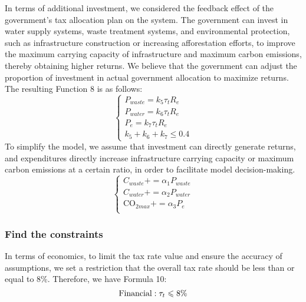 \documentclass[12pt]{article}  %
\begin{document}
In terms of additional investment, we considered the feedback effect of the government's tax allocation plan on the system. The government can invest in water supply systems, waste treatment systems, and environmental protection, such as infrastructure construction or increasing afforestation efforts, to improve the maximum carrying capacity of infrastructure and maximum carbon emissions, thereby obtaining higher returns. We believe that the government can adjust the proportion of investment in actual government allocation to maximize returns. The resulting Function 8 is as follows:
\begin{equation}
	\begin{cases}
		P_{waste} = k_5\tau_tR_e\\
		P_{water} = k_6\tau_tR_e\\
		P_{e}=k_7\tau_{t}R_e \\
		k_5+k_6+k_7 \leqslant 0.4
	\end{cases}
\end{equation}
To simplify the model, we assume that investment can directly generate returns, and expenditures directly increase infrastructure carrying capacity or maximum carbon emissions at a certain ratio, in order to facilitate model decision-making.
\begin{equation}
	\begin{cases}
		C_{waste}+=\alpha_1P_{waste} \\
		C_{water}+=\alpha_2P_{water} \\
		\text{CO}_{2max}+=\alpha_3P_e \\
	\end{cases}
	\end{equation}

\subsubsection{Find the constraints}
In terms of economics, to limit the tax rate value and ensure the accuracy of assumptions, we set a restriction that the overall tax rate should be less than or equal to 8\%. Therefore, we have Formula 10:
\begin{equation}
	\text{Financial}:\tau_{t}\leqslant 8\% \\
\end{equation}
\end{document}
